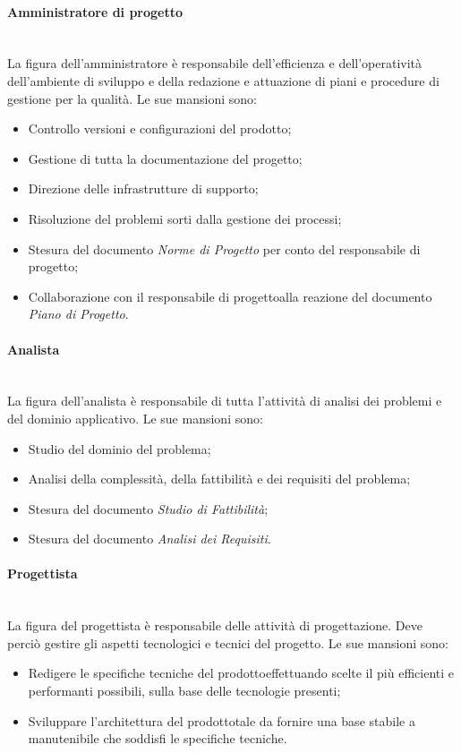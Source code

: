 			\paragraph{Amministratore di progetto}\mbox{}\\ [1mm]
				La figura dell'amministratore è responsabile dell'efficienza e dell'operatività dell'ambiente di sviluppo e della redazione e attuazione di piani e procedure di gestione per la qualità.
				Le sue mansioni sono:
				\begin{itemize}
					\item Controllo versioni e configurazioni del prodotto\glo;
					\item Gestione di tutta la documentazione del progetto\glo;
					\item Direzione delle infrastrutture di supporto;
					\item Risoluzione del problemi sorti dalla gestione dei processi\glo;
					\item Stesura del documento \textit{Norme di Progetto} per conto del responsabile di progetto\glo;
					\item Collaborazione con il responsabile di progetto\glo alla reazione del documento \textit{Piano di Progetto}.
				\end{itemize}
			\paragraph{Analista}\mbox{}\\ [1mm]
				La figura dell'analista è responsabile di tutta l'attività di analisi dei problemi e del dominio applicativo.
				Le sue mansioni sono:
				\begin{itemize}
					\item Studio del dominio del problema;
					\item Analisi della complessità, della fattibilità e dei requisiti del problema;
					\item Stesura del documento \textit{Studio di Fattibilità};
					\item Stesura del documento \textit{Analisi dei Requisiti}.
				\end{itemize}
			\paragraph{Progettista}\mbox{}\\ [1mm]
				La figura del progettista è responsabile delle attività di progettazione\glo. Deve perciò gestire gli aspetti tecnologici e tecnici del progetto\glo.
				Le sue mansioni sono:
				\begin{itemize}
					\item Redigere le specifiche tecniche del prodotto\glosp effettuando scelte il più efficienti e performanti possibili, sulla base delle tecnologie presenti;
					\item Sviluppare l'architettura del prodotto\glosp tale da fornire una base stabile a manutenibile che soddisfi le specifiche tecniche.
				\end{itemize}
